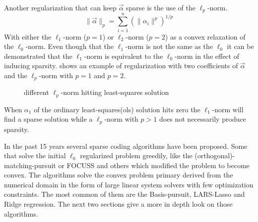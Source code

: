 Another regularization that can keep $\vec{\alpha}$ sparse is the use of the
$\ell_p$-norm.
\begin{equation*}
\lVert \vec{\alpha}\rVert_p = \sum_{i=1}^n\left(\lVert \alpha_i
\lVert^p\right)^{1/p}
\end{equation*}
With either the $\ell_1$-norm ($p=1$) or $\ell_2$-norm ($p=2$) as a
convex relaxation of the $\ell_0$-norm. Even though that the $\ell_1$-norm is
not the same as the $\ell_0$ it can be demonstrated that the $\ell_1$-norm is
equivalent to the $\ell_0$-norm in the effect of inducing sparsity. 
 shows an example of regularization with two coefficients
of $\vec{\alpha}$ and the $\ell_p$-norm with $p=1$ and $p=2$.
\begin{figure}[h]
\centering
{}
\vspace{2mm}
\caption[$\ell_p$ regularization]{different $\ell_p$-norm hitting least-squares
solution}
\label{fig:sparse}
\end{figure}
When $\alpha_1$ of the ordinary least-squares(ols) solution hits zero the
$\ell_1$-norm will find a sparse solution while a $\ell_p$-norm with $p>1$ does
not necessarily produce sparsity.

In the past 15 years several sparse coding algorithms have been proposed. Some
that solve the initial $\ell_0$ regularized problem greedily, like
the (orthogonal)-matching-pursuit or FOCUSS and others which modified the
problem to become convex. The algorithms solve the convex problem  primary
derived from the numerical domain in the form of large linear system solvers
with few optimization constraints. The most common of them are the
Basis-pursuit, LARS-Lasso and Ridge regression. The next two sections give a
more in depth look on those algorithms. 

